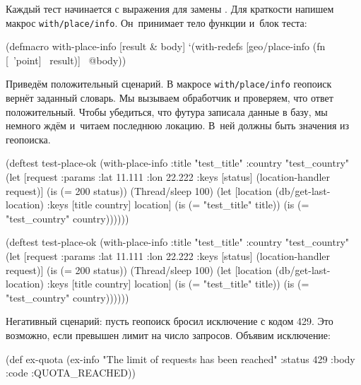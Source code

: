 Каждый тест начинается с выражения  для замены
. Для краткости напишем макрос
\texttt{with\-/place\-/info}. Он~принимает тело функции и~блок теста:

\begin{clojure}
(defmacro with-place-info
  [result & body]
  `(with-redefs [geo/place-info
                 (fn [~'point] ~result)]
     ~@body))
\end{clojure}

Приведём положительный сценарий. В макросе \texttt{with\-/place\-/info} геопоиск
вернёт заданный словарь. Мы вызываем обработчик и проверяем, что ответ
положительный. Чтобы убедиться, что футура записала данные в базу, мы немного
ждём и~читаем последнюю локацию. В~ней должны быть значения из геопоиска.

\ifnarrow

\begin{clojure}
(deftest test-place-ok
  (with-place-info
    {:title "test_title"
     :country "test_country"}
    (let [request {:params
                   {:lat 11.111
                    :lon 22.222}}
          {:keys [status]}
          (location-handler request)]
      (is (= 200 status))
      (Thread/sleep 100)
      (let [location
            (db/get-last-location)
            {:keys [title country]}
            location]
        (is (= "test_title" title))
        (is (= "test_country"
               country))))))
\end{clojure}

\else

\begin{clojure}
(deftest test-place-ok
  (with-place-info
    {:title "test_title"
     :country "test_country"}
    (let [request {:params {:lat 11.111 :lon 22.222}}
          {:keys [status]} (location-handler request)]
      (is (= 200 status))
      (Thread/sleep 100)
      (let [location (db/get-last-location)
            {:keys [title country]} location]
        (is (= "test_title" title))
        (is (= "test_country" country))))))
\end{clojure}

\fi


Негативный сценарий: пусть геопоиск бросил исключение с кодом 429. Это
возможно, если превышен лимит на число запросов. Объявим исключение:

\ifnarrow

\begin{clojure}
(def ex-quota
  (ex-info
    "The limit of requests
               has been reached"
    {:status 429
     :body {:code :QUOTA_REACHED}}))
\end{clojure}

